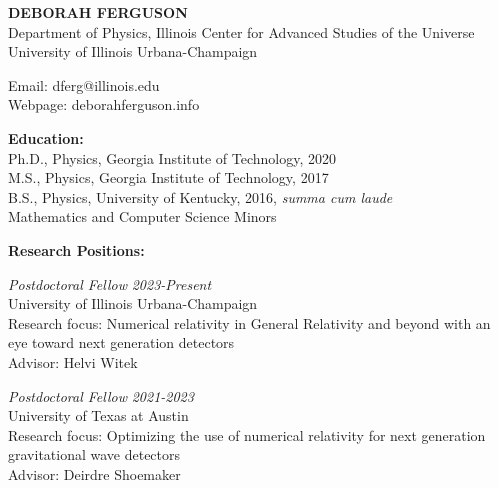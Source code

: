 \documentclass[11pt]{article}
\begin{document}
%	
\begin{center}
  \textbf{DEBORAH FERGUSON}\\
  Department of Physics, Illinois Center for Advanced Studies of the Universe\\
  University of Illinois Urbana-Champaign\\
\end{center}  

\begin{flushleft}

  Email: dferg@illinois.edu\\
  Webpage: deborahferguson.info\\
  \vspace{8px}
  
  \textbf{Education:}\\
  Ph.D., Physics, Georgia Institute of Technology, 2020\\
  M.S., Physics, Georgia Institute of Technology, 2017\\
  B.S., Physics, University of Kentucky, 2016, \textit{summa cum laude} \\ Mathematics and Computer Science Minors\\

\vspace{8px}

  \textbf{Research Positions:}\\
  \vspace{4px}
  
  \textit{Postdoctoral Fellow} \hfill \textit{2023-Present} \\
  University of Illinois Urbana-Champaign\\
  Research focus: Numerical relativity in General Relativity and beyond with an\\ eye toward next generation detectors\\
  Advisor: Helvi Witek\\
  
 \vspace{8px}  
 
  \textit{Postdoctoral Fellow} \hfill \textit{2021-2023} \\
  University of Texas at Austin\\
  Research focus: Optimizing the use of numerical relativity for next generation\\ gravitational wave detectors\\
  Advisor: Deirdre Shoemaker\\
  

\end{flushleft}
\end{document}
